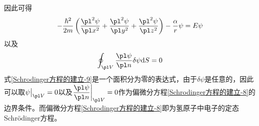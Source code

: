 因此可得
\begin{equation}
	-\frac{\hbar^2}{2m}\left(\frac{\pl^2 \psi}{\pl x^2} + \frac{\pl^2 \psi}{\pl y^2} + \frac{\pl^2 \psi}{\pl z^2}\right) - \frac{\alpha}{r}\psi = E\psi
	\label{Schrodinger方程的建立-8}
\end{equation}
以及
\begin{equation}
	\oint_{\pl V} \frac{\pl \psi}{\pl n} \delta \psi \mathrm{d}S = 0
	\label{Schrodinger方程的建立-9}
\end{equation}
式\eqref{Schrodinger方程的建立-9}是一个面积分为零的表达式，由于$\delta \psi$是任意的，因此可以取$\psi\big|_{\pl V} = 0$以及$\dfrac{\pl \psi}{\pl n}\bigg|_{\pl V} = 0$作为偏微分方程\eqref{Schrodinger方程的建立-8}的边界条件。而偏微分方程\eqref{Schrodinger方程的建立-8}即为氢原子中电子的定态Schr\"{o}dinger方程。
